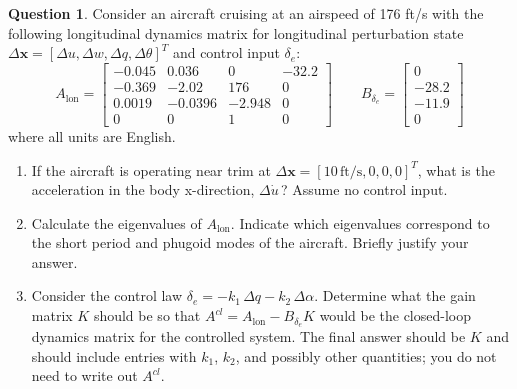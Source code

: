 \documentclass{article}
\theoremstyle{definition}
\newtheorem{question}{Question}
\begin{document}
\begin{question} Consider an aircraft cruising at an airspeed of 176 ft/s with the following longitudinal dynamics matrix for longitudinal perturbation state $\Delta \mathbf{x} = [ \Delta u, \Delta w, \Delta q, \Delta \theta ]^T$ and control input $\delta_e$:
\[
A_{\text{lon}} = \begin{bmatrix}
-0.045 & 0.036 & 0 & -32.2 \\
-0.369 & -2.02 & 176 & 0 \\
0.0019 & -0.0396 & -2.948 & 0 \\
0 & 0 & 1 & 0
\end{bmatrix} \quad \quad B_{\delta_e} = \begin{bmatrix}
0 \\
-28.2 \\
-11.9 \\
0 
\end{bmatrix}
\]
where all units are English.

\begin{enumerate}

    \item If the aircraft is operating near trim at $\Delta \mathbf{x} = [10\,\text{ft/s}, 0, 0, 0]^T$, what is the acceleration in the body x-direction, $\Delta \dot{u}\,$? Assume no control input.

\item Calculate the eigenvalues of $A_\text{lon}$. Indicate which eigenvalues correspond to the short period and phugoid modes of the aircraft. Briefly justify your answer.

\item Consider the control law $\delta_e = -k_1 \, \Delta q - k_2 \, \Delta \alpha$. Determine what the gain matrix $K$ should be so that $A^{cl} = A_{\text{lon}} - B_{\delta_e} K$ would be the closed-loop dynamics matrix for the controlled system. The final answer should be $K$ and should include entries with $k_1$, $k_2$, and possibly other quantities; you do not need to write out $A^{cl}$.



\end{enumerate}
\end{question}
\end{document}
